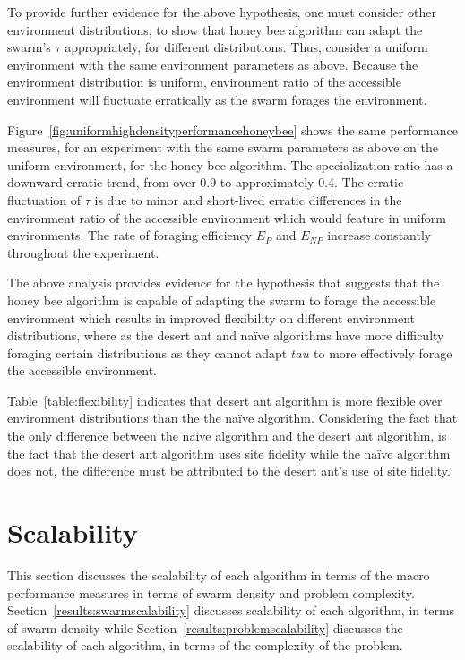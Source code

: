 To provide further evidence for the above hypothesis, one must consider other environment distributions, to show that honey bee algorithm can adapt the swarm's $\tau$ appropriately, for different distributions. Thus, consider a uniform environment with the same environment parameters as above. Because the environment distribution is uniform, environment ratio of the accessible environment will fluctuate erratically as the swarm forages the environment.  

Figure~\ref{fig:uniformhighdensityperformancehoneybee} shows the same performance measures, for an experiment with the same swarm parameters as above on the uniform environment, for the honey bee algorithm. The specialization ratio has a downward erratic trend, from over 0.9 to approximately 0.4. The erratic fluctuation of $\tau$ is due to minor and short-lived erratic differences in the environment ratio of the accessible environment which would feature in uniform environments. The rate of foraging efficiency $E_P$ and $E_{NP}$  increase constantly throughout the experiment. 

The above analysis provides evidence for the hypothesis that suggests that the honey bee algorithm is capable of adapting the swarm to forage the accessible environment which results in improved flexibility on different environment distributions, where as the desert ant and na\"ive algorithms have more difficulty foraging certain distributions as they cannot adapt $
tau$ to more effectively forage the accessible environment.

Table~\ref{table:flexibility} indicates that desert ant algorithm is more flexible over environment distributions than the the na\"ive algorithm. Considering the fact that the only difference between the na\"ive algorithm and the desert ant algorithm, is the fact that the desert ant algorithm uses site fidelity while the na\"ive algorithm does not, the difference must be attributed to the desert ant's use of site fidelity. %

\section{Scalability}
\label{results:scalability}

This section discusses the scalability of each algorithm in terms of the macro performance measures in terms of swarm density and problem complexity. Section~\ref{results:swarmscalability} discusses scalability of each algorithm, in terms of swarm density while Section~\ref{results:problemscalability} discusses the scalability of each algorithm, in terms of the complexity of the problem.

